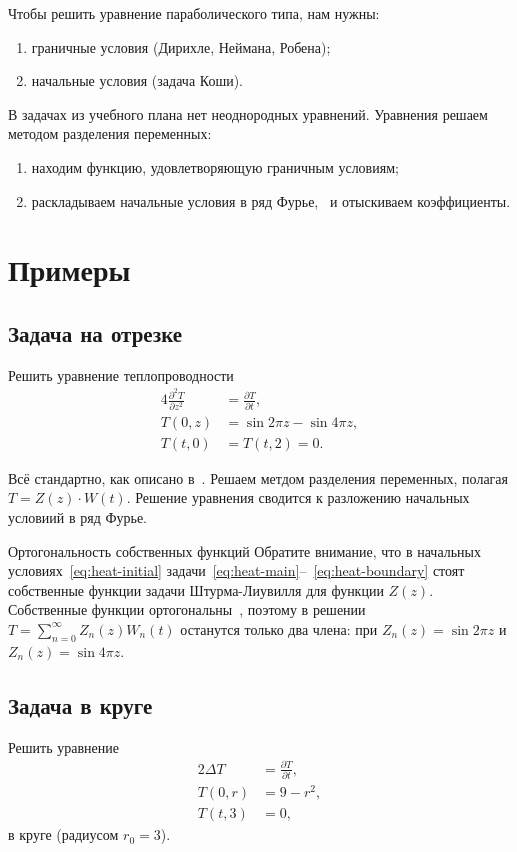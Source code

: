 \documentclass[12pt]{report}
\begin{document}
Чтобы решить уравнение параболического типа, нам нужны:
\begin{enumerate}
	\item граничные условия (Дирихле, Неймана, Робена);
	\item начальные условия (задача Коши).
\end{enumerate}

В задачах из учебного плана нет неоднородных уравнений. Уравнения решаем методом разделения переменных:~\cite{diffusion-equation}
\begin{enumerate}
	\item находим функцию, удовлетворяющую граничным условиям;
	\item раскладываем начальные условия в ряд Фурье,~\cite{Fourier-series} и отыскиваем коэффициенты.
\end{enumerate}


\section{Примеры}
\subsection{Задача на отрезке}
Решить уравнение теплопроводности
\begin{align}
	4\frac{\partial^2T}{\partial z^2} &= \frac{\partial T}{\partial t}, \label{eq:heat-main}\\
	T(0, z) &= \sin 2\pi z - \sin 4\pi z, \label{eq:heat-initial}\\
	T(t,0) &= T(t,2) =0.\label{eq:heat-boundary}
\end{align}

Всё стандартно, как описано в~\cite{diffusion-equation}. Решаем метдом разделения переменных, полагая
$T = Z(z)\cdot W(t)$. Решение уравнения сводится к разложению начальных условиий в ряд Фурье.

\begin{rmk}{Ортогональность собственных функций}
	Обратите внимание, что в начальных условиях~\eqref{eq:heat-initial}
	задачи~\eqref{eq:heat-main}--~\eqref{eq:heat-boundary} стоят собственные функции
	задачи Штурма-Лиувилля для функции $Z(z)$.
	Собственные функции ортогональны~\cite[стр.~17]{UMF-problems-solutions}, поэтому 
	в решении $T = \sum_{n=0}^{\infty} Z_n(z)W_n(t)$ останутся только два члена: при 
	$Z_n(z) = \sin2\pi z$ и $Z_n(z) = \sin4\pi z$.
\end{rmk}

\subsection{Задача в круге}
Решить уравнение
\begin{align}
2\Delta T &= \frac{\partial T}{\partial t}, \label{eq:circle}\\
T(0, r) &= 9 - r^2,\\
T(t,3) &=0,
\end{align}
в круге (радиусом $r_0 = 3$).
\end{document}
